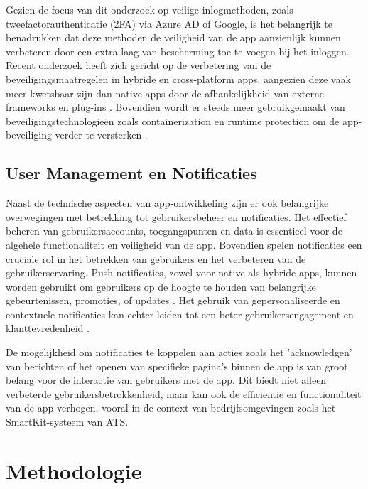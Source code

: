Gezien de focus van dit onderzoek op veilige inlogmethoden, zoals tweefactorauthenticatie (2FA) via Azure AD of Google, is het belangrijk te benadrukken dat deze methoden de veiligheid van de app aanzienlijk kunnen verbeteren door een extra laag van bescherming toe te voegen bij het inloggen. Recent onderzoek heeft zich gericht op de verbetering van de beveiligingsmaatregelen in hybride en cross-platform apps, aangezien deze vaak meer kwetsbaar zijn dan native apps door de afhankelijkheid van externe frameworks en plug-ins \autocite{Wang2015}. Bovendien wordt er steeds meer gebruikgemaakt van beveiligingstechnologieën zoals containerization en runtime protection om de app-beveiliging verder te versterken \autocite{Weichbroth2020}.

\subsection{User Management en Notificaties} 
\noindent Naast de technische aspecten van app-ontwikkeling zijn er ook belangrijke overwegingen met betrekking tot gebruikersbeheer en notificaties. Het effectief beheren van gebruikersaccounts, toegangspunten en data is essentieel voor de algehele functionaliteit en veiligheid van de app. Bovendien spelen notificaties een cruciale rol in het betrekken van gebruikers en het verbeteren van de gebruikerservaring. Push-notificaties, zowel voor native als hybride apps, kunnen worden gebruikt om gebruikers op de hoogte te houden van belangrijke gebeurtenissen, promoties, of updates \autocite{Android2024}. Het gebruik van gepersonaliseerde en contextuele notificaties kan echter leiden tot een beter gebruikersengagement en klanttevredenheid \autocite{Sarin}.

De mogelijkheid om notificaties te koppelen aan acties zoals het 'acknowledgen' van berichten of het openen van specifieke pagina's binnen de app is van groot belang voor de interactie van gebruikers met de app. Dit biedt niet alleen verbeterde gebruikersbetrokkenheid, maar kan ook de efficiëntie en functionaliteit van de app verhogen, vooral in de context van bedrijfsomgevingen zoals het SmartKit-systeem van ATS.



\section{Methodologie}
\label{sec:methodologie}

